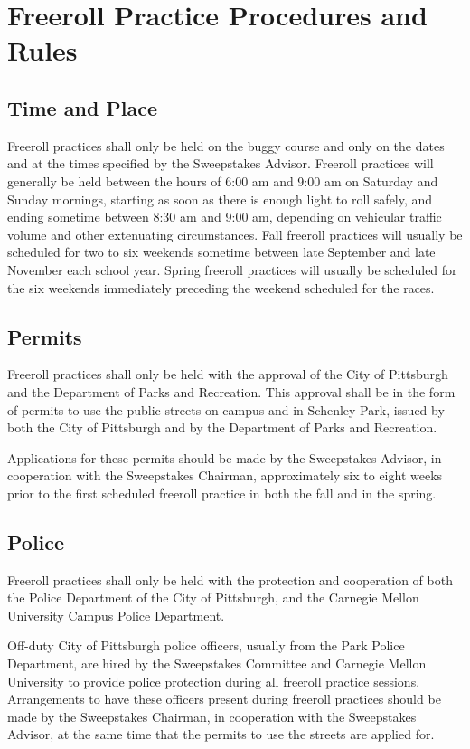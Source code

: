 \documentclass[openany]{book}
\begin{document}
\section{Freeroll Practice Procedures and Rules}

\subsection{Time and Place}

Freeroll practices shall only be held on the buggy course and only on the dates and at the times specified by the Sweepstakes Advisor. Freeroll practices will generally be held between the hours of 6:00 am and 9:00 am on Saturday and Sunday mornings, starting as soon as there is enough light to roll safely, and ending sometime between 8:30 am and 9:00 am, depending on vehicular traffic volume and other extenuating circumstances. Fall freeroll practices will usually be scheduled for two to six weekends sometime between late September and late November each school year. Spring freeroll practices will usually be scheduled for the six weekends immediately preceding the weekend scheduled for the races.

\subsection{Permits}

Freeroll practices shall only be held with the approval of the City of Pittsburgh and the Department of Parks and Recreation. This approval shall be in the form of permits to use the public streets on campus and in Schenley Park, issued by both the City of Pittsburgh and by the Department of Parks and Recreation.

Applications for these permits should be made by the Sweepstakes Advisor, in cooperation with the Sweepstakes Chairman, approximately six to eight weeks prior to the first scheduled freeroll practice in both the fall and in the spring.

\subsection{Police}

Freeroll practices shall only be held with the protection and cooperation of both the Police Department of the City of Pittsburgh, and the Carnegie Mellon University Campus Police Department.

Off-duty City of Pittsburgh police officers, usually from the Park Police Department, are hired by the Sweepstakes Committee and Carnegie Mellon University to provide police protection during all freeroll practice sessions. Arrangements to have these officers present during freeroll practices should be made by the Sweepstakes Chairman, in cooperation with the Sweepstakes Advisor, at the same time that the permits to use the streets are applied for.
\end{document}
